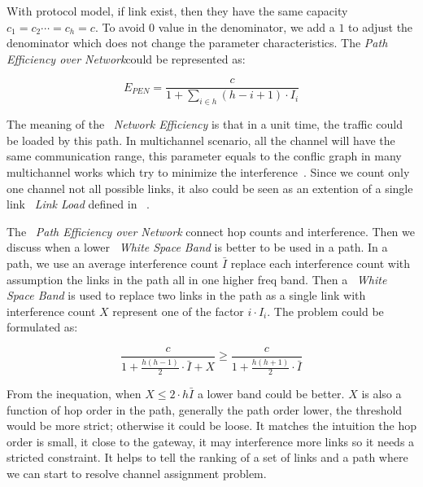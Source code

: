 With protocol model, if link exist, then they have the same capacity $c_1=c_2 \cdots =c_h=c$. 
To avoid $0$ value in the denominator, we add a $1$ to adjust the denominator which does not change the parameter characteristics. 
The \emph{Path Efficiency over Network}could be represented as:


\begin{equation}
\label{eq:pen}
E_{PEN}=\frac{c}{1+\sum_{i \in h} (h-i+1)\cdot I_i}
\end{equation}
 

The meaning of the ~\emph{Network Efficiency} is that in a unit time, the traffic could be loaded by this path. In multichannel scenario, all the channel will have the same communication range, this parameter equals to the conflic graph in many multichannel works which try to minimize the interference~\cite{jain2005impact}. Since we count only one channel not all possible links, it also could be seen as an extention of a single link ~\emph{Link Load} defined in ~\cite{raniwala2004centralized}.

The ~\emph{Path Efficiency over Network} connect hop counts and interference. 
Then we discuss when a lower ~\emph{White Space Band} is better to be used in a path.
In a path, we use an average interference count $\bar{I}$ replace each interference count with assumption the links in the path all in one higher freq band. Then a ~\emph{White Space Band} is used to replace two links in the path as a single link with interference count $X$ represent one of the factor $i\cdot I_i$. The problem could be formulated as:

 
\begin{equation}
\label{eq:benefit}
\frac{c}{1+\frac{h(h-1)}{2}\cdot \bar{I}+X} \geq \frac{c}{1+\frac{h(h+1)}{2}\cdot \bar{I}}
\end{equation}

From the inequation, when $X \leq 2\cdot h\bar{I}$ a lower band could be better. $X$ is also a function of hop order in the path, generally the path order lower, the threshold would be more strict; otherwise it could be loose. It matches the intuition the hop order is small, it close to the gateway, it may interference more links so it needs a stricted constraint.
It helps to tell the ranking of a set of links and a path where we can start to resolve channel assignment problem.








